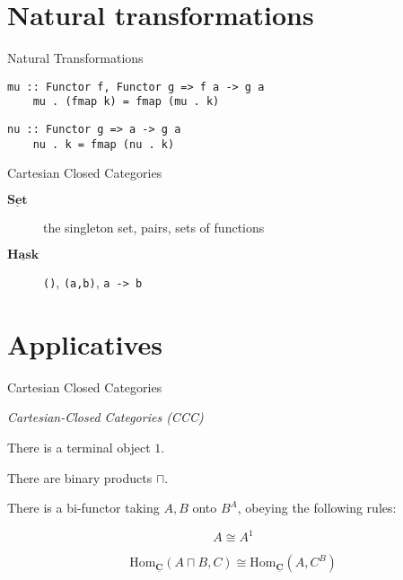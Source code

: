 \documentclass[10pt]{beamer}
\newcommand{\Cat}[1]{\ensuremath{\underline{\mathbf{#1}}}}
\newcommand{\Hom}[3]{\ensuremath{\mathrm{Hom}_{\Cat{#1}}(#2,#3)}}
\newcommand{\Com}[3]{#3^{#2}}
\newcommand{\eqnlabel}[1]{\label{eq:#1}}
\theoremstyle{definition}
\theoremstyle{remark}
\numberwithin{equation}{section}
\begin{document}
\section{Natural transformations}

\begin{frame}[fragile]{Natural Transformations}

  \begin{lstlisting}[frame=single]
    mu :: Functor f, Functor g => f a -> g a
    mu . (fmap k) = fmap (mu . k)
  \end{lstlisting}
  
  \begin{lstlisting}[frame=single]
    nu :: Functor g => a -> g a
    nu . k = fmap (nu . k)
  \end{lstlisting}
  
\end{frame}

\begin{frame}[fragile]{Cartesian Closed Categories}

  \begin{description}
    \item[\Cat{Set}] the singleton set, pairs, sets of functions
    \item[\Cat{Hask}] \lstinline{()}, \lstinline{(a,b)}, \lstinline{a -> b}
  \end{description}

\end{frame}

\section{Applicatives}

\begin{frame}[fragile]{Cartesian Closed Categories}

  \emph{Cartesian-Closed Categories (CCC)}

  There is a terminal object $1$.

  There are binary products $\sqcap$.

  There is a bi-functor taking $A,B$ onto $\Com{C}{A}{B}$, obeying the following rules:
  
  \[
  A \cong \Com{C}{1}{A}
  \]
  
  \begin{equation}
  \Hom{C}{A\sqcap B}{C} \cong \Hom{C}{A}{\Com{C}{B}{C}} \eqnlabel{exp1}
  \end{equation}
\end{frame}
\end{document}
